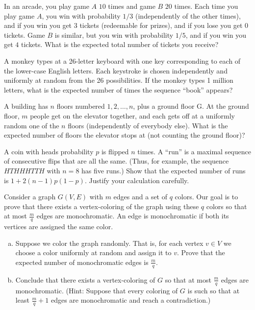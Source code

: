 \begin{Parts}
\Part  In an arcade, you play game $A$ $10$ times and game $B$ $20$ times. Each time you play game $A$, you win with probability $1/3$ (independently of the other times), and if you win you get $3$ tickets (redeemable for prizes), and if you lose you get $0$ tickets. Game $B$ is similar, but you win with probability $1/5$, and if you win you get $4$ tickets. What is the expected total number of tickets you receive?
\nosolspace{1cm}

\Part A monkey types at a 26-letter keyboard with one key corresponding to each of the lower-case English letters. Each keystroke is chosen independently and uniformly at random from the 26 possibilities. If the monkey types 1 million letters, what is the expected number of times the sequence ``book'' appears?
\nosolspace{1cm}

\Part A building has $n$ floors numbered $1,2,\ldots,n$, plus a ground floor G. At the ground floor, $m$ people get on the elevator together, and each gets off at a uniformly random one of the $n$ floors (independently of everybody else). What is the expected number of floors the elevator stops at (not counting the ground floor)?
\nosolspace{1cm}

\Part A coin with heads probability $p$ is flipped $n$ times. A ``run'' is a maximal sequence of consecutive flips that are all the same. (Thus, for example, the sequence $HTHHHTTH$ with $n=8$ has five runs.) Show that the expected number of runs is $1+2(n-1)p(1-p)$. Justify your calculation carefully.
\nosolspace{1cm}

\end{Parts}




Consider a graph $G(V,E)$ with $m$ edges and a set of $q$ colors. Our goal is to prove that there exists a vertex-coloring of the graph using these $q$ colors  so that at most $\frac{m}{q}$ edges are monochromatic. An edge is monochromatic if both its vertices are assigned the same color.

\begin{enumerate}[(a)]

\item Suppose we color the graph randomly. That is, for each vertex $v \in V$ we choose a color uniformly at random and assign it to $v$. Prove that the expected number of monochromatic edges is $\frac{m}{q}$.

\item Conclude that there exists a vertex-coloring of $G$ so that at most $\frac{m}{q}$ edges are monochromatic. (Hint: Suppose that every coloring of $G$ is such so that at least $\frac{m}{q} +1$ edges are monochromatic and reach a contradiction.)
	
\end{enumerate}

